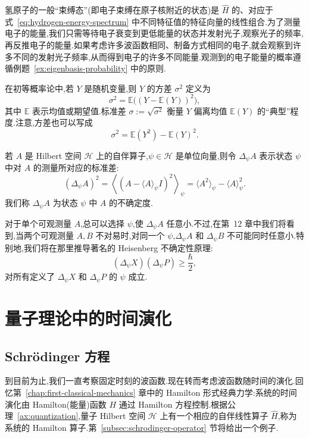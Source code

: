 氢原子的一般“束缚态”(即电子束缚在原子核附近的状态)是 \(\widehat H\) 的、对应于式~\eqref{eq:hydrogen-energy-spectrum} 中不同特征值的特征向量的线性组合.为了测量电子的能量,我们只需等待电子衰变到更低能量的状态并发射光子,观察光子的频率,再反推电子的能量.如果考虑许多波函数相同、制备方式相同的电子,就会观察到许多不同的发射光子频率,从而得到电子的许多不同能量.观测到的电子能量的概率遵循例题~\ref{ex:eigenbasis-probability} 中的原则.

在初等概率论中,若 \(Y\) 是随机变量,则 \(Y\) 的方差 \(\sigma^{2}\) 定义为
\[
\sigma^{2}=\mathbb{E}\bigl((Y-\mathbb{E}(Y))^{2}\bigr),
\]
其中 \(\mathbb{E}\) 表示均值或期望值.标准差 \(\sigma:=\sqrt{\sigma^{2}}\) 衡量 \(Y\) 偏离均值 \(\mathbb{E}(Y)\) 的“典型”程度.注意,方差也可以写成
\begin{equation}
\sigma^{2}=\mathbb{E}(Y^{2})-\mathbb{E}(Y)^{2}.
\label{eq:variance-formula}
\end{equation}

\begin{definition}[不确定度]\label{def:quantum-uncertainty}
若 \(A\) 是 Hilbert 空间 \(\mathcal{H}\) 上的自伴算子,\(\psi\in\mathcal{H}\) 是单位向量,则令 \(\Delta_{\psi}A\) 表示状态 \(\psi\) 中对 \(A\) 的测量所对应的标准差:
\[
(\Delta_{\psi}A)^{2}
=\left\langle(A-\langle A\rangle_{\psi}I)^{2}\right\rangle_{\psi}
=\langle A^{2}\rangle_{\psi}-\langle A\rangle_{\psi}^{2}.
\]
我们称 \(\Delta_{\psi}A\) 为状态 \(\psi\) 中 \(A\) 的不确定度.
\end{definition}

对于单个可观测量 \(A\),总可以选择 \(\psi\),使 \(\Delta_{\psi}A\) 任意小.不过,在第~12 章中我们将看到,当两个可观测量 \(A,B\) 不对易时,对同一个 \(\psi\),\(\Delta_{\psi}A\) 和 \(\Delta_{\psi}B\) 不可能同时任意小.特别地,我们将在那里推导著名的 Heisenberg 不确定性原理:
\[
(\Delta_{\psi}X)(\Delta_{\psi}P)\ge\frac{\hbar}{2},
\]
对所有定义了 \(\Delta_{\psi}X\) 和 \(\Delta_{\psi}P\) 的 \(\psi\) 成立.

\section{量子理论中的时间演化}\label{sec:time-evolution}

\subsection{Schrödinger 方程}\label{subsec:schrodinger-equation}

到目前为止,我们一直考察固定时刻的波函数.现在转而考虑波函数随时间的演化.回忆第~\ref{chap:first-classical-mechanics} 章中的 Hamilton 形式经典力学:系统的时间演化由 Hamilton(能量)函数 \(H\) 通过 Hamilton 方程控制.根据公理~\ref{ax:quantization},量子 Hilbert 空间 \(\mathcal{H}\) 上有一个相应的自伴线性算子 \(\widehat H\),称为系统的 Hamilton 算子.第~\ref{subsec:schrodinger-operator} 节将给出一个例子.

